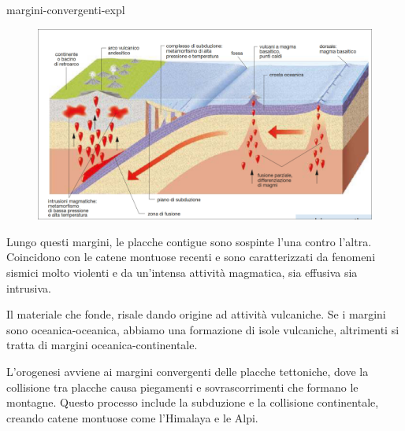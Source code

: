 \documentclass[preview]{standalone}
\begin{document}
\begin{snippet}{margini-convergenti-expl}
    \setlength{\intextsep}{0pt}%
    \begin{figure}
        \includegraphics[width=.55\textwidth]{resources/margini-convergenti.png}
    \end{figure}

    Lungo questi margini, le placche contigue sono sospinte l'una contro l'altra.
    Coincidono con le catene montuose recenti e sono caratterizzati da fenomeni sismici
    molto violenti e da un'intensa attività magmatica, sia effusiva sia intrusiva.

    Il materiale che fonde, risale dando origine ad attività vulcaniche.
    Se i margini sono oceanica-oceanica, abbiamo una formazione di isole vulcaniche,
    altrimenti si tratta di margini oceanica-continentale.

    L'orogenesi avviene ai margini convergenti delle placche tettoniche, dove la collisione tra
    placche causa piegamenti e sovrascorrimenti che formano le montagne. Questo processo include la
    subduzione e la collisione continentale, creando catene montuose come l'Himalaya e le Alpi.
    \wrapfill
    

\end{snippet}
\end{document}
